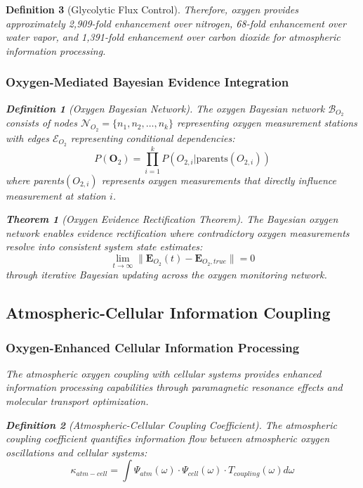 \documentclass[12pt,a4paper]{article}
\newtheorem{theorem}{Theorem}
\newtheorem{definition}{Definition}
\begin{document}
\begin{definition}[Glycolytic Flux Control]
Therefore, oxygen provides approximately 2,909-fold enhancement over nitrogen, 68-fold enhancement over water vapor, and 1,391-fold enhancement over carbon dioxide for atmospheric information processing.

\subsubsection{Oxygen-Mediated Bayesian Evidence Integration}

\begin{definition}[Oxygen Bayesian Network]
The oxygen Bayesian network $\mathcal{B}_{O_2}$ consists of nodes $\mathcal{N}_{O_2} = \{n_1, n_2, \ldots, n_k\}$ representing oxygen measurement stations with edges $\mathcal{E}_{O_2}$ representing conditional dependencies:
\begin{equation}
P(\mathbf{O}_2) = \prod_{i=1}^k P(O_{2,i} | \text{parents}(O_{2,i}))
\end{equation}
where parents$(O_{2,i})$ represents oxygen measurements that directly influence measurement at station $i$.
\end{definition}

\begin{theorem}[Oxygen Evidence Rectification Theorem]
The Bayesian oxygen network enables evidence rectification where contradictory oxygen measurements resolve into consistent system state estimates:
\begin{equation}
\lim_{t \to \infty} \|\mathbf{E}_{O_2}(t) - \mathbf{E}_{O_2,true}\| = 0
\end{equation}
through iterative Bayesian updating across the oxygen monitoring network.
\end{theorem}

\subsection{Atmospheric-Cellular Information Coupling}

\subsubsection{Oxygen-Enhanced Cellular Information Processing}

The atmospheric oxygen coupling with cellular systems provides enhanced information processing capabilities through paramagnetic resonance effects and molecular transport optimization.

\begin{definition}[Atmospheric-Cellular Coupling Coefficient]
The atmospheric coupling coefficient quantifies information flow between atmospheric oxygen oscillations and cellular systems:
\begin{equation}
\kappa_{atm-cell} = \int \Psi_{atm}(\omega) \cdot \Psi_{cell}(\omega) \cdot T_{coupling}(\omega) d\omega
\end{equation}
\end{definition}


\end{definition}
\end{document}
